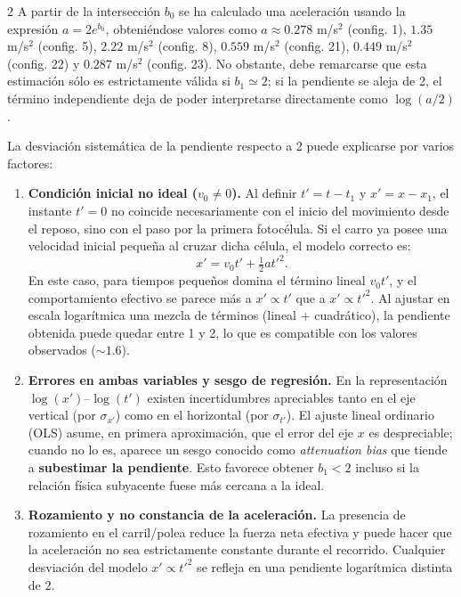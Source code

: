 \documentclass[12pt,a4paper]{article}
\begin{document}
\begin{multicols}{2}
\bigskip
A partir de la intersección $b_0$ se ha calculado una aceleración usando la expresión $a = 2e^{b_0}$, obteniéndose valores como $a\approx 0.278$ m/s$^2$ (config. 1), $1.35$ m/s$^2$ (config. 5), $2.22$ m/s$^2$ (config. 8), $0.559$ m/s$^2$ (config. 21), $0.449$ m/s$^2$ (config. 22) y $0.287$ m/s$^2$ (config. 23). No obstante, debe remarcarse que esta estimación sólo es estrictamente válida si $b_1\simeq 2$; si la pendiente se aleja de 2, el término independiente deja de poder interpretarse directamente como $\log(a/2)$.

\bigskip
La desviación sistemática de la pendiente respecto a 2 puede explicarse por varios factores:

\begin{enumerate}
\item \textbf{Condición inicial no ideal ($v_0\neq 0$).}
Al definir $t'=t-t_1$ y $x'=x-x_1$, el instante $t'=0$ no coincide necesariamente con el inicio del movimiento desde el reposo, sino con el paso por la primera fotocélula. Si el carro ya posee una velocidad inicial pequeña al cruzar dicha célula, el modelo correcto es:
\begin{equation}
x' = v_0 t' + \tfrac{1}{2} a t'^2.
\end{equation}
En este caso, para tiempos pequeños domina el término lineal $v_0t'$, y el comportamiento efectivo se parece más a $x'\propto t'$ que a $x'\propto t'^2$. Al ajustar en escala logarítmica una mezcla de términos (lineal + cuadrático), la pendiente obtenida puede quedar entre 1 y 2, lo que es compatible con los valores observados ($\sim 1.6$).

\item \textbf{Errores en ambas variables y sesgo de regresión.}
En la representación $\log(x')$--$\log(t')$ existen incertidumbres apreciables tanto en el eje vertical (por $\sigma_{x'}$) como en el horizontal (por $\sigma_{t'}$). El ajuste lineal ordinario (OLS) asume, en primera aproximación, que el error del eje $x$ es despreciable; cuando no lo es, aparece un sesgo conocido como \emph{attenuation bias} que tiende a \textbf{subestimar la pendiente}. Esto favorece obtener $b_1<2$ incluso si la relación física subyacente fuese más cercana a la ideal.

\item \textbf{Rozamiento y no constancia de la aceleración.}
La presencia de rozamiento en el carril/polea reduce la fuerza neta efectiva y puede hacer que la aceleración no sea estrictamente constante durante el recorrido. Cualquier desviación del modelo $x'\propto t'^2$ se refleja en una pendiente logarítmica distinta de 2.
\end{enumerate}


\end{multicols}
\end{document}
